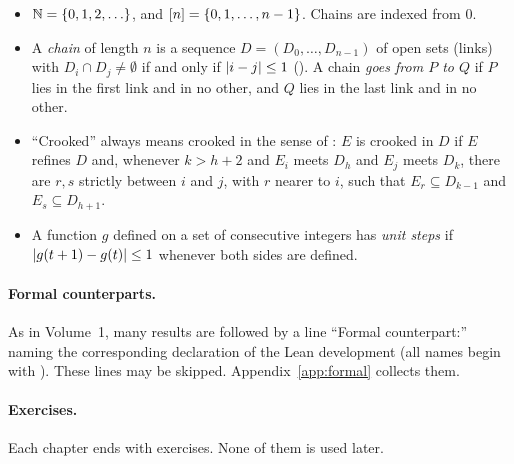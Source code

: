 \begin{itemize}
\item $\N=\set{0,1,2,\dots}$, and $[n]=\left\{ 0,1,\dots,n-1 \right\}$. Chains are indexed from $0$.
\item A \emph{chain} of length $n$ is a sequence $D=(D_0,\dots,D_{n-1})$ of open sets (links)
with $D_i\cap D_j\neq\emptyset$ if and only if $\left\lvert i-j\right\rvert\le1$ (). A chain
\emph{goes from $P$ to $Q$} if $P$ lies in the first link and in no other, and $Q$ lies in the
last link and in no other.
\item ``Crooked'' always means crooked in the sense of : $E$ is crooked
in $D$ if $E$ refines $D$ and, whenever $k>h+2$ and $E_i$ meets $D_h$ and $E_j$ meets $D_k$, there
are $r,s$ strictly between $i$ and $j$, with $r$ nearer to $i$, such that $E_r\subseteq D_{k-1}$
and $E_s\subseteq D_{h+1}$.
\item A function $g$ defined on a set of consecutive integers has \emph{unit steps} if
$\left\lvert g(t+1)-g(t)\right\rvert\le1$ whenever both sides are defined.
\end{itemize}

\paragraph{Formal counterparts.} As in Volume~1, many results are followed by a line
``Formal counterpart:'' naming the corresponding declaration of the Lean development (all names
begin with ). These lines may be skipped. Appendix~\ref{app:formal} collects them.

\paragraph{Exercises.} Each chapter ends with exercises. None of them is used later.
